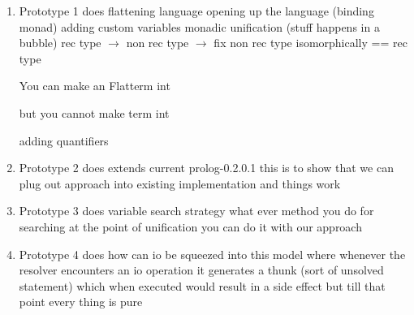 \documentclass[thesis-solanki.tex]{subfiles}
\begin{document}
\begin{enumerate}
\item Prototype 1 does 
flattening language
opening up the language (binding monad)
adding custom variables
monadic unification (stuff happens in a bubble)
rec type $\rightarrow$ non rec type $\rightarrow$ fix non rec type isomorphically == rec type

You can make an Flatterm int

but you cannot make term int

adding quantifiers 


\item Prototype 2 does
extends current prolog-0.2.0.1
this is to show that we can plug out approach into existing implementation and things work

\item Prototype 3 does
variable search strategy
what ever method you do for searching at the point of unification you can do it with our approach

\item Prototype 4 does
how can io be squeezed into this model where whenever the resolver encounters an io operation it generates a thunk (sort of unsolved 
statement) which when executed would result in a side effect but till that point every thing is pure

\end{enumerate}
\end{document}
